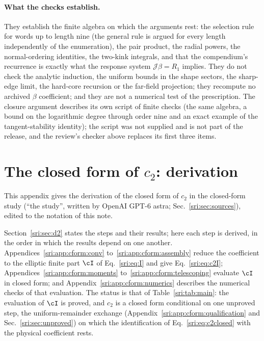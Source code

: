 \paragraph{What the checks establish.} They establish the finite algebra on which the arguments rest: the selection
rule for words up to length nine (the general rule is argued for every length independently of the enumeration), the
pair product, the radial powers, the normal-ordering identities, the two-kink integrals, and that the compendium's
recurrence is exactly what the response system $\mathcal J\beta=R_1$ implies. They do not check the analytic
induction, the uniform bounds in the shape sectors, the sharp-edge limit, the hard-core recursion or the far-field
projection; they recompute no archived $\beta$ coefficient; and they are not a numerical test of the prescription. The
closure argument describes its own script of finite checks (the same algebra, a bound on the logarithmic degree
through order nine and an exact example of the tangent-stability identity); the script was not supplied and is not part
of the release, and the review's checker above replaces its first three items.

\section{The closed form of \texorpdfstring{$c_2$}{c2}: derivation}\label{sri:app:cform}
This appendix gives the derivation of the closed form of $c_2$ in the closed-form study (``the study'', written by
OpenAI GPT-6 astra; Sec.~\ref{sri:sec:sources}), edited to the notation of this note.

Section~\ref{sri:sec:d2} states the steps and their results; here each step is derived, in the order in which the
results depend on one another. Appendices~\ref{sri:app:cform:conv} to~\ref{sri:app:cform:assembly} reduce the coefficient to
the elliptic finite part $\cI$ of Eq.~\eqref{sri:eq:I} and give Eq.~\eqref{sri:eq:c2I};
Appendices~\ref{sri:app:cform:moments} to~\ref{sri:app:cform:telescoping} evaluate $\cI$ in closed form; and
Appendix~\ref{sri:app:cform:numerics} describes the numerical checks of that evaluation. The status is that of
Table~\ref{sri:tab:main}: the evaluation of $\cI$ is proved, and $c_2$ is a closed form conditional on one unproved step,
the uniform-remainder exchange (Appendix~\ref{sri:app:cform:qualification} and Sec.~\ref{sri:sec:unproved}) on which the
identification of Eq.~\eqref{sri:eq:c2closed} with the physical coefficient rests.

